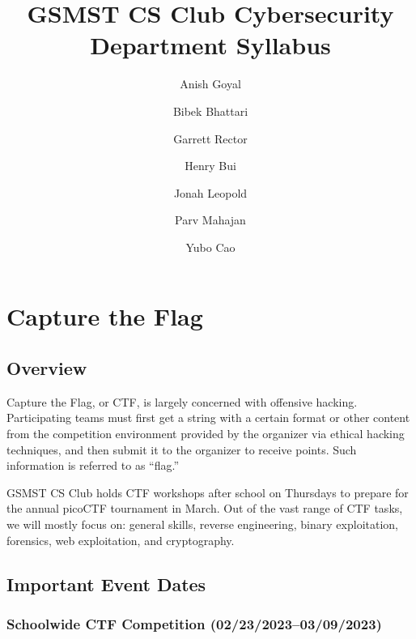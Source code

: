 \documentclass[
  letterpaper,
  DIV=11,
  numbers=noendperiod]{scrartcl}
\title{GSMST CS Club Cybersecurity Department Syllabus}
\author{Anish Goyal \and Bibek Bhattari \and Garrett Rector \and Henry
Bui \and Jonah Leopold \and Parv Mahajan \and Yubo Cao}
\date{}
\renewcommand*\contentsname{Table of contents}
\newcommand\contentsname{Table of contents}
\begin{document}
\maketitle
\ifdefined\Shaded\renewenvironment{Shaded}{\begin{tcolorbox}[sharp corners, boxrule=0pt, interior hidden, frame hidden, breakable, enhanced, borderline west={3pt}{0pt}{shadecolor}]}{\end{tcolorbox}}\fi

\renewcommand*\contentsname{Table of Contents}
{
\hypersetup{linkcolor=}
\setcounter{tocdepth}{6}
\tableofcontents
}
\newpage{}

\hypertarget{capture-the-flag}{%
\section{Capture the Flag}\label{capture-the-flag}}

\hypertarget{overview}{%
\subsection{Overview}\label{overview}}

Capture the Flag, or CTF, is largely concerned with offensive hacking.
Participating teams must first get a string with a certain format or
other content from the competition environment provided by the organizer
via ethical hacking techniques, and then submit it to the organizer to
receive points. Such information is referred to as ``flag.''

GSMST CS Club holds CTF workshops after school on Thursdays to prepare
for the annual picoCTF tournament in March. Out of the vast range of CTF
tasks, we will mostly focus on: general skills, reverse engineering,
binary exploitation, forensics, web exploitation, and cryptography.

\hypertarget{important-event-dates}{%
\subsection{Important Event Dates}\label{important-event-dates}}

\hypertarget{schoolwide-ctf-competition-0223202303092023}{%
\subsubsection{Schoolwide CTF Competition
(02/23/2023--03/09/2023)}\label{schoolwide-ctf-competition-0223202303092023}}
\end{document}
